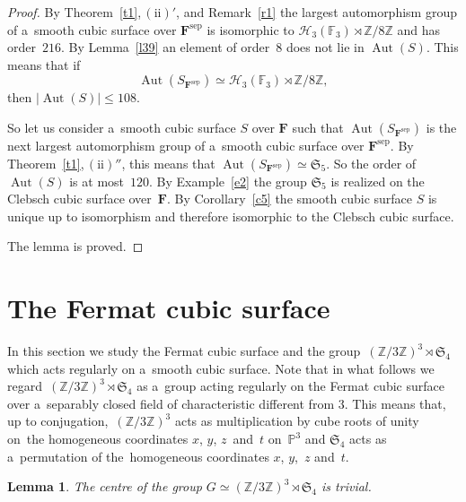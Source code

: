 \documentclass{amsart}
\numberwithin{equation}{section}
\theoremstyle{plain}
\newtheorem{lemma}{Lemma}
\theoremstyle{definition}
\theoremstyle{remark}
\begin{document}
\begin{proof}
 By Theorem~\ref{t1},\,$(\mathrm{ii})'$, and Remark~\ref{r1} the largest automorphism group of a~smooth cubic surface over $\mathbf{F}^{\mathrm{sep}}$ is isomorphic to $\mathcal{H}_3(\mathbb{F}_3) \rtimes \mathbb{Z}/8\mathbb{Z}$ and has order~$216$. By Lemma~\ref{l39} an element of order~$8$ does not lie in $\operatorname{Aut}(S)$. This means that if
$$
\operatorname{Aut}(S_{\mathbf{F}^{\mathrm{sep}}}) \simeq \mathcal{H}_3(\mathbb{F}_3) \rtimes \mathbb{Z}/8\mathbb{Z},
$$
then $|{\operatorname{Aut}(S)}| \leqslant 108$.

So let us consider a~smooth cubic surface $S$ over $\mathbf{F}$ such that $\operatorname{Aut}(S_{\mathbf{F}^{\mathrm{sep}}})$ is the next largest automorphism group of a~smooth cubic surface over $\mathbf{F}^{\mathrm{sep}}$. By Theorem~\ref{t1},\,$(\mathrm{ii})''$, this means that $\operatorname{Aut}(S_{\mathbf{F}^{\mathrm{sep}}}) \simeq \mathfrak{S}_5$. So the order of~$\operatorname{Aut}(S)$ is at most~$120$. By Example~\ref{e2} the group $\mathfrak{S}_5$ is realized on the Clebsch cubic surface over~$\mathbf{F}$. By Corollary~\ref{c5} the smooth cubic surface $S$ is unique up to isomorphism and therefore isomorphic to the Clebsch cubic surface.

The lemma is proved.
\end{proof}


\section{The Fermat cubic surface}
\label{s6}

In this section we study the Fermat cubic surface and the group~\mbox{$(\mathbb{Z}/3\mathbb{Z})^3 \rtimes \mathfrak{S}_4$} which acts regularly on a~smooth cubic surface.
 Note that in what follows we regard~\mbox{$(\mathbb{Z}/3\mathbb{Z})^3 \rtimes \mathfrak{S}_4$} as a~group acting regularly 
 on the Fermat cubic surface over a~separably closed field of characteristic different from $3$. This means that, up to conjugation,~$(\mathbb{Z}/3\mathbb{Z})^3$ acts as multiplication by cube roots of unity on~the homogeneous coordinates $x$, $y$, $z$~and~$t$ on~$\mathbb{P}^3$ and $\mathfrak{S}_4$ acts as a~permutation of the~homogeneous coordinates $x$, $y$,~$z$ and~$t$.

\begin{lemma}
\label{l41}
The centre of the group $G \simeq (\mathbb{Z}/3\mathbb{Z})^3 \rtimes \mathfrak{S}_4$ is trivial.
\end{lemma}
\end{document}
